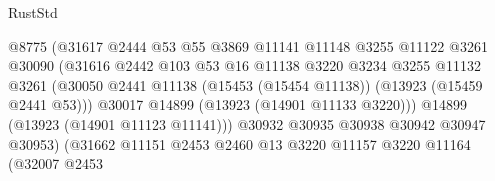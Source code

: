 \begin{lexlean}{RustStd}
\begin{coremodule}
                                          @8775
                                          (@31617
                                            @2444
                                            @53
                                            @55
                                            @3869
                                            @11141
                                            @11148
                                            @3255
                                            @11122
                                            @3261
                                            @30090
                                            (@31616
                                              @2442
                                              @103
                                              @53
                                              @16
                                              @11138
                                              @3220
                                              @3234
                                              @3255
                                              @11132
                                              @3261
                                              (@30050
                                                @2441
                                                @11138
                                                (@15453 (@15454 @11138))
                                                (@13923 (@15459 @2441 @53)))
                                              @30017
                                              @14899
                                              (@13923 (@14901 @11133 @3220)))
                                            @14899
                                            (@13923 (@14901 @11123 @11141)))
                                          @30932
                                          @30935
                                          @30938
                                          @30942
                                          @30947
                                          @30953)
                                        (@31662
                                          @11151
                                          @2453
                                          @2460
                                          @13
                                          @3220
                                          @11157
                                          @3220
                                          @11164
                                          (@32007
                                            @2453

\end{coremodule}
\end{lexlean}
